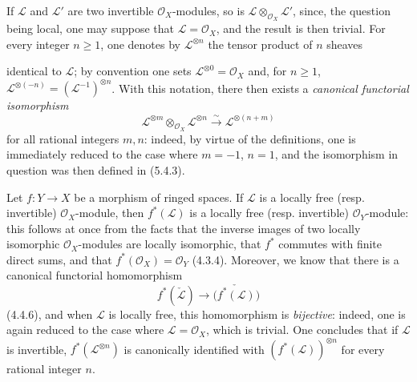 \begin{env}[5.4.4]
\label{0.5.4.4}
If $\mathcal{L}$ and $\mathcal{L}'$ are two invertible $\mathcal{O}_X$-modules,
so is $\mathcal{L}\otimes_{\mathcal{O}_X}\mathcal{L}'$, since, the question being
local, one may suppose that $\mathcal{L}=\mathcal{O}_X$, and the result is
then trivial. For every integer $n\geq1$, one denotes by
$\mathcal{L}^{\otimes n}$ the tensor product of $n$ sheaves


identical to $\mathcal{L}$; by convention one sets
$\mathcal{L}^{\otimes0}=\mathcal{O}_X$ and, for $n\geq1$,
$\mathcal{L}^{\otimes(-n)}=(\mathcal{L}^{-1})^{\otimes n}$. With this
notation, there then exists a \emph{canonical functorial isomorphism}
\[
  \mathcal{L}^{\otimes m}\otimes_{\mathcal{O}_X}\mathcal{L}^{\otimes n}
  \xrightarrow{\sim}
  \mathcal{L}^{\otimes(n+m)}
  \tag{5.4.4.1}\label{0.5.4.4.1}
\]
for all rational integers $m,n$: indeed, by virtue of the
definitions, one is immediately reduced to the case where $m=-1$, $n=1$, and
the isomorphism in question was then defined in (5.4.3).
\end{env}

\begin{env}[5.4.5]\label{0.5.4.5}
Let $f:Y\to X$ be a morphism of ringed spaces. If $\mathcal{L}$ is a
locally free (resp. invertible) $\mathcal{O}_X$-module, then
$f^*(\mathcal{L})$ is a locally free (resp.
invertible) $\mathcal{O}_Y$-module: this follows at once from the facts that the inverse images of two
locally isomorphic $\mathcal{O}_X$-modules are locally isomorphic, that
$f^*$ commutes with finite direct sums, and that
$f^*(\mathcal{O}_X)=\mathcal{O}_Y$ (4.3.4). Moreover, we know that there is a
canonical functorial homomorphism
\[
  f^*(\check{\mathcal{L}})
  \longrightarrow
  \check{\bigl(f^*(\mathcal{L})\bigr)}
\]
(4.4.6), and when $\mathcal{L}$ is locally free, this homomorphism is
\emph{bijective}: indeed, one is again reduced to the case where
$\mathcal{L}=\mathcal{O}_X$, which is trivial. One concludes that if
$\mathcal{L}$ is invertible, $f^*(\mathcal{L}^{\otimes n})$ is canonically
identified with $(f^*(\mathcal{L}))^{\otimes n}$ for every rational integer
$n$.
\end{env}


